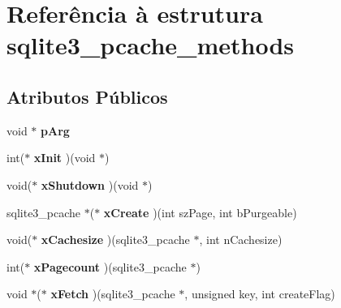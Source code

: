 \hypertarget{structsqlite3__pcache__methods}{\section{Referência à estrutura sqlite3\-\_\-pcache\-\_\-methods}
\label{structsqlite3__pcache__methods}
}
\subsection*{Atributos Públicos}
\begin{DoxyCompactItemize}
\item 
\hypertarget{structsqlite3__pcache__methods_a90394a920f6a09dd13553aeb79bbed88}{void $\ast$ {\bfseries p\-Arg}}\label{structsqlite3__pcache__methods_a90394a920f6a09dd13553aeb79bbed88}

\item 
\hypertarget{structsqlite3__pcache__methods_ab5f54101f6060de1af0c87b2456231ad}{int($\ast$ {\bfseries x\-Init} )(void $\ast$)}\label{structsqlite3__pcache__methods_ab5f54101f6060de1af0c87b2456231ad}

\item 
\hypertarget{structsqlite3__pcache__methods_aa88bb238d288631e7e06f4da232c3dbb}{void($\ast$ {\bfseries x\-Shutdown} )(void $\ast$)}\label{structsqlite3__pcache__methods_aa88bb238d288631e7e06f4da232c3dbb}

\item 
\hypertarget{structsqlite3__pcache__methods_a36b1da95aeb7972c3c0d358aedf2a3d4}{sqlite3\-\_\-pcache $\ast$($\ast$ {\bfseries x\-Create} )(int sz\-Page, int b\-Purgeable)}\label{structsqlite3__pcache__methods_a36b1da95aeb7972c3c0d358aedf2a3d4}

\item 
\hypertarget{structsqlite3__pcache__methods_a9cf385dbec7f0d19793e2616a73a3b7f}{void($\ast$ {\bfseries x\-Cachesize} )(sqlite3\-\_\-pcache $\ast$, int n\-Cachesize)}\label{structsqlite3__pcache__methods_a9cf385dbec7f0d19793e2616a73a3b7f}

\item 
\hypertarget{structsqlite3__pcache__methods_a0ab192dc811798e8f17c445dbf379989}{int($\ast$ {\bfseries x\-Pagecount} )(sqlite3\-\_\-pcache $\ast$)}\label{structsqlite3__pcache__methods_a0ab192dc811798e8f17c445dbf379989}

\item 
\hypertarget{structsqlite3__pcache__methods_a2e054ad70c9672b504d3d7291e4eb487}{void $\ast$($\ast$ {\bfseries x\-Fetch} )(sqlite3\-\_\-pcache $\ast$, unsigned key, int create\-Flag)}\label{structsqlite3__pcache__methods_a2e054ad70c9672b504d3d7291e4eb487}


\end{DoxyCompactItemize}
